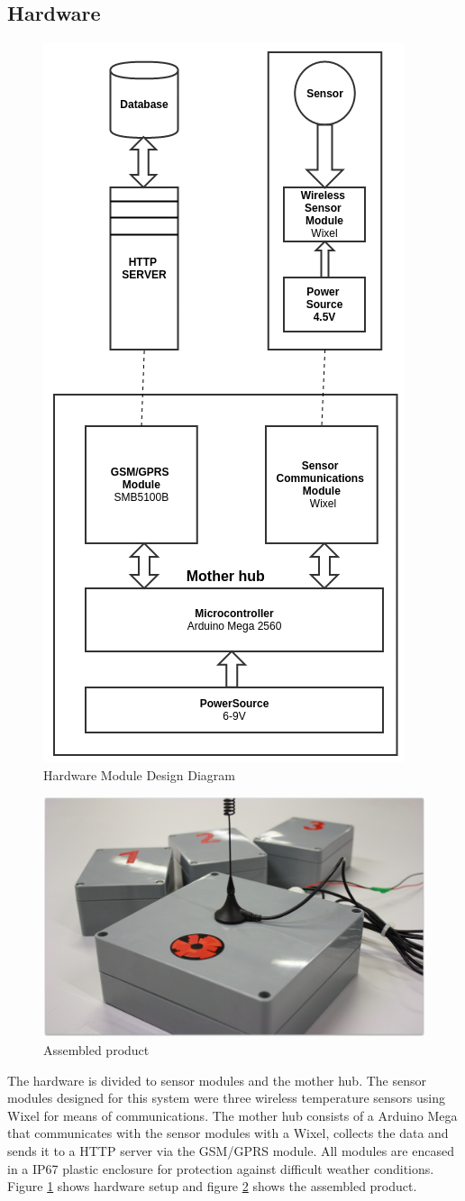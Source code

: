 \subsection{Hardware}
\begin{figure}
\centering
\includegraphics[width=0.5\linewidth]{graphics/HardwareMDD}
\caption{Hardware Module Design Diagram\label{fig:HardwareMDD}}
\end{figure}
\begin{figure}
\centering
\includegraphics[width=0.8\linewidth]{graphics/Our_product}
\caption{Assembled product\label{fig:Our_product}}
\end{figure}
The hardware is divided to sensor modules and the mother hub. The sensor modules 
designed for this system were three wireless temperature sensors using Wixel\cite{wixel}
for means of communications. The mother hub consists of a Arduino Mega\cite{arduinoMega}
that communicates with the sensor modules with a Wixel, collects the data 
and sends it to a HTTP server via the GSM/GPRS module\cite{SM5100B}. All modules are 
encased in a IP67\cite{ipRating} plastic enclosure for protection against difficult weather conditions.
Figure \ref{fig:HardwareMDD} shows hardware setup and figure \ref{fig:Our_product} shows the assembled 
product. 
